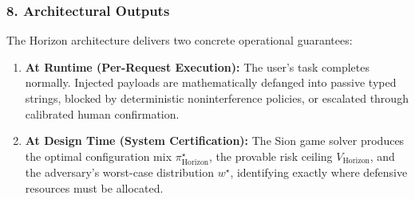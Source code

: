 \subsubsection{8. Architectural Outputs}
The Horizon architecture delivers two concrete operational guarantees:
\begin{enumerate}
    \item \textbf{At Runtime (Per-Request Execution):} The user's task completes normally. Injected payloads are mathematically defanged into passive typed strings, blocked by deterministic noninterference policies, or escalated through calibrated human confirmation.
    \item \textbf{At Design Time (System Certification):} The Sion game solver produces the optimal configuration mix $\pi^\star_{\mathrm{Horizon}}$, the provable risk ceiling $V_{\mathrm{Horizon}}$, and the adversary's worst-case distribution $w^\star$, identifying exactly where defensive resources must be allocated.
\end{enumerate}
